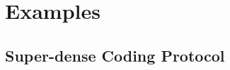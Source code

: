 \documentclass[runningheads]{llncs}
\def\leaveout#1{}
\begin{document}

\section{Examples}
\label{sec:examples}
\subsection{Super-dense Coding Protocol}\label{sec:sdc}
\end{document}

